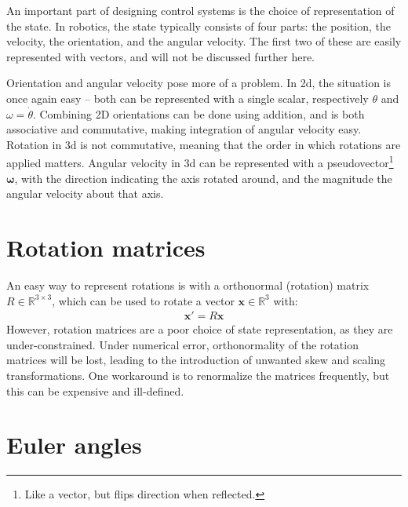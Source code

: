 \documentclass[main.tex]{subfiles}
\begin{document}
An important part of designing control systems is the choice of representation of the state. In robotics, the state typically consists of four parts: the position, the velocity, the orientation, and the angular velocity. The first two of these are easily represented with vectors, and will not be discussed further here.

Orientation and angular velocity pose more of a problem. In 2d, the situation is once again easy -- both can be represented with a single scalar, respectively $\theta$ and $\omega = \dot{\theta}$.
Combining 2D orientations can be done using addition, and is both associative and commutative, making integration of angular velocity easy.
Rotation in 3d is not commutative, meaning that the order in which rotations are applied matters.
Angular velocity in 3d can be represented with a pseudovector\footnote{Like a vector, but flips direction when reflected.} $\bm{\omega}$, with the direction indicating the axis rotated around, and the magnitude the angular velocity about that axis.

\section{Rotation matrices}

	An easy way to represent rotations is with a orthonormal (rotation) matrix $R \in \mathbb{R}^{3\times3}$, which can be used to rotate a vector $\bm{x} \in \mathbb{R}^{3}$ with:
	\begin{align}
		\bm{x}' = R \bm{x}
	\end{align}
	However, rotation matrices are a poor choice of state representation, as they are under-constrained.
	Under numerical error, orthonormality of the rotation matrices will be lost, leading to the introduction of unwanted skew and scaling transformations. One workaround is to renormalize the matrices frequently, but this can be expensive and ill-defined.

\section{Euler angles}
\label{app:euler-angles}
\end{document}

